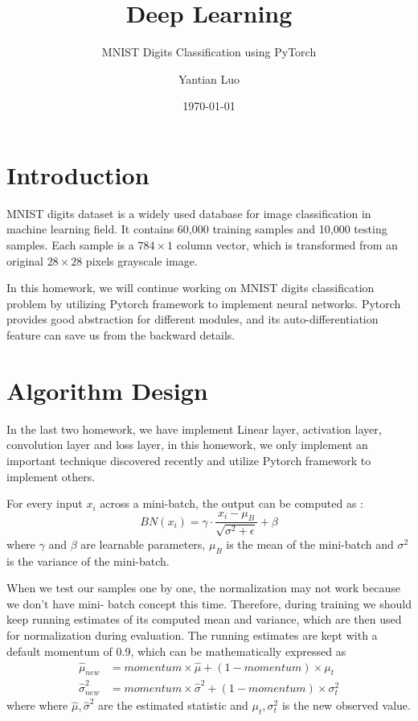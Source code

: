 \documentclass{elegantbook}
\title{Deep Learning}
\subtitle{MNIST Digits Classification using PyTorch}
\author{Yantian Luo}
\institute{Electronic Engineering}
\date{\today}
\begin{document}
\maketitle
\tableofcontents
\mainmatter
\hypersetup{pageanchor=true}
\chapter{Introduction}
MNIST digits dataset is a widely used database for image classification in machine learning field. It contains 60,000 training samples and 10,000 testing samples. Each sample is a $784\times1$ column vector, which is transformed from an original $28\times28$ pixels grayscale image.

In this homework, we will continue working on MNIST digits classification problem by utilizing Pytorch framework to implement neural networks. Pytorch provides good abstraction for different modules, and its auto-differentiation feature can save us from the backward details.

\chapter{Algorithm Design}
In the last two homework, we have implement Linear layer, activation layer, convolution layer and loss layer, in this homework, we only implement an important technique discovered recently and utilize Pytorch framework to implement others.

For every input $x_i$ across a mini-batch, the output can be computed as :
\begin{equation}
BN(x_i)=\gamma \cdot \frac{x_i-\mu_B}{\sqrt{\sigma^2+\epsilon}}+\beta
\end{equation}
where $\gamma$ and $\beta$ are learnable parameters, $\mu_B$ is the mean of the mini-batch and $\sigma^2$ is the variance of the mini-batch.

When we test our samples one by one, the normalization may not work because we don’t have mini- batch concept this time. Therefore, during training we should keep running estimates of its computed mean and variance, which are then used for normalization during evaluation. The running estimates are kept with a default momentum of 0.9, which can be mathematically expressed as
\begin{equation}
\begin{aligned}
\hat{\mu}_{new} &= momentum \times \hat{\mu} + (1-momentum)\times \mu_t \\
\hat{\sigma}_{new}^2 &= momentum \times \hat{\sigma}^2 + (1-momentum)\times \sigma_t^2
\end{aligned}
\end{equation}
where where $\hat{\mu},\hat{\sigma}^2$ are the estimated statistic and $\mu_t,\sigma_t^2$ is the new observed value. 
\end{document}

